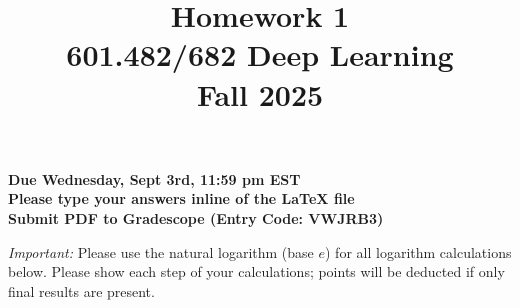 \documentclass[a4paper]{article}
\title{Homework 1\\
601.482/682 Deep Learning\\
Fall 2025}
\date{}
\author{\bf{}}
\begin{document}
\maketitle

\begin{center}
\textbf{Due Wednesday, Sept 3rd, 11:59 pm EST\\
Please type your answers inline of the LaTeX file \\
Submit PDF to Gradescope (Entry Code: VWJRB3)}\\
\end{center}

\vspace{5mm}

\noindent \textit{Important:} Please use the natural logarithm (base $e$) for all logarithm calculations below. Please show each step of your calculations; points will be deducted if only final results are present.
\end{document}
